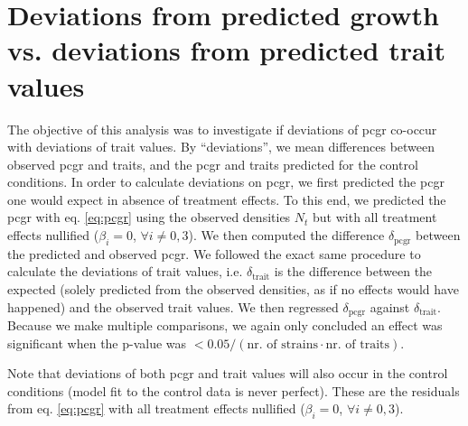 \section{Deviations from predicted growth vs. deviations from predicted trait values}

The objective of this analysis was to investigate if deviations of pcgr co-occur with deviations of trait values. By ``deviations'', we mean differences between observed pcgr and traits, and the pcgr and traits predicted for the control conditions. In order to calculate deviations on pcgr, we first predicted the pcgr one would expect in absence of treatment effects. To this end, we predicted the pcgr with eq. \ref{eq:pcgr} using the observed densities $N_t$ but with all treatment effects nullified ($\beta_i=0$, $\forall i \neq 0, 3$). We then computed the difference $\delta_\textrm{pcgr}$ between the predicted and observed pcgr. We followed the exact same procedure to calculate the deviations of trait values, i.e. $\delta_\textrm{trait}$ is the difference between the expected (solely predicted from the observed densities, as if no effects would have happened) and the observed trait values. We then regressed $\delta_\textrm{pcgr}$ against $\delta_\textrm{trait}$. Because we make multiple comparisons, we again only concluded an effect was significant when the p-value was $<0.05/(\textrm{nr. of strains}\cdot \textrm{nr. of traits})$. 

Note that deviations of both pcgr and trait values will also occur in the control conditions (model fit to the control data is never perfect). These are the residuals from eq. \ref{eq:pcgr} with all treatment effects nullified ($\beta_i=0$, $\forall i \neq 0, 3$). 